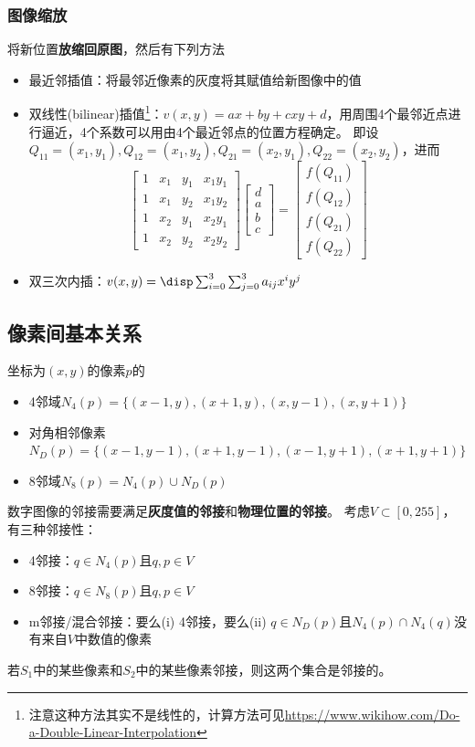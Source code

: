 \subsubsection{图像缩放}
将新位置\textbf{放缩回原图}，然后有下列方法
\begin{itemize}
	\item 最近邻插值：将最邻近像素的灰度将其赋值给新图像中的值
	\item 双线性(bilinear)插值\footnote{注意这种方法其实不是线性的，计算方法可见\url{https://www.wikihow.com/Do-a-Double-Linear-Interpolation}}：$v(x,y)=ax+by+cxy+d$，用周围4个最邻近点进行逼近，4个系数可以用由4个最近邻点的位置方程确定。
	即设$Q_{11}=(x_1,y_1),Q_{12} = (x_1, y_2), Q_{21} = (x_2, y_1), Q_{22} = (x_2, y_2)$，进而
	\[\begin{bmatrix}1&x_{1}&y_{1}&x_{1}y_{1}\\1&x_{1}&y_{2}&x_{1}y_{2}\\1&x_{2}&y_{1}&x_{2}y_{1}\\1&x_{2}&y_{2}&x_{2}y_{2}\end{bmatrix}\begin{bmatrix}d\\a\\b\\c\end{bmatrix}=\begin{bmatrix}f(Q_{11})\\f(Q_{12})\\f(Q_{21})\\f(Q_{22})\end{bmatrix}\]
	\item 双三次内插：$v(x,y)=\disp\sum_{i=0}^3\sum_{j=0}^3a_{ij}x^iy^j$
\end{itemize}

\subsection{像素间基本关系}
\begin{definition}[邻域]
坐标为$(x,y)$的像素$p$的
\begin{itemize}
\item 4邻域$N_4(p)=\{(x-1,y),(x+1,y),(x,y-1),(x,y+1)\}$
\item 对角相邻像素$N_D(p)=\{(x-1,y-1),(x+1,y-1),(x-1,y+1),(x+1,y+1)\}$
\item 8邻域$N_8(p)=N_4(p)\cup N_D(p)$
\end{itemize}
\end{definition}

\begin{definition}[邻接性]
数字图像的邻接需要满足\textbf{灰度值的邻接}和\textbf{物理位置的邻接}。
考虑$V\subset[0,255]$，有三种邻接性：
\begin{itemize}
	\item 4邻接：$q\in N_4(p)$且$q,p\in V$
	\item 8邻接：$q\in N_8(p)$且$q,p\in V$
	\item m邻接/混合邻接：要么(i) 4邻接，要么(ii) $q\in N_D(p)$且$N_4(p)\cap N_4(q)$没有来自$V$中数值的像素
\end{itemize}
若$S_1$中的某些像素和$S_2$中的某些像素邻接，则这两个集合是邻接的。
\end{definition}

